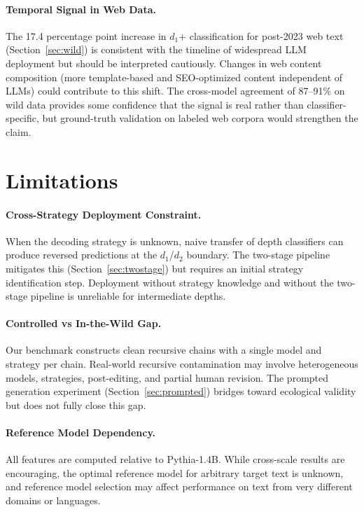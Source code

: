 \documentclass[11pt,a4paper]{article}
\begin{document}
\paragraph{Temporal Signal in Web Data.}
The 17.4 percentage point increase in $d_1$+ classification for post-2023 web text (Section~\ref{sec:wild}) is consistent with the timeline of widespread LLM deployment but should be interpreted cautiously. Changes in web content composition (more template-based and SEO-optimized content independent of LLMs) could contribute to this shift. The cross-model agreement of 87--91\% on wild data provides some confidence that the signal is real rather than classifier-specific, but ground-truth validation on labeled web corpora would strengthen the claim.

\section{Limitations}

\paragraph{Cross-Strategy Deployment Constraint.}
When the decoding strategy is unknown, naive transfer of depth classifiers can produce reversed predictions at the $d_1$/$d_2$ boundary. The two-stage pipeline mitigates this (Section~\ref{sec:twostage}) but requires an initial strategy identification step. Deployment without strategy knowledge and without the two-stage pipeline is unreliable for intermediate depths.

\paragraph{Controlled vs In-the-Wild Gap.}
Our benchmark constructs clean recursive chains with a single model and strategy per chain. Real-world recursive contamination may involve heterogeneous models, strategies, post-editing, and partial human revision. The prompted generation experiment (Section~\ref{sec:prompted}) bridges toward ecological validity but does not fully close this gap.

\paragraph{Reference Model Dependency.}
All features are computed relative to Pythia-1.4B. While cross-scale results are encouraging, the optimal reference model for arbitrary target text is unknown, and reference model selection may affect performance on text from very different domains or languages.
\end{document}
